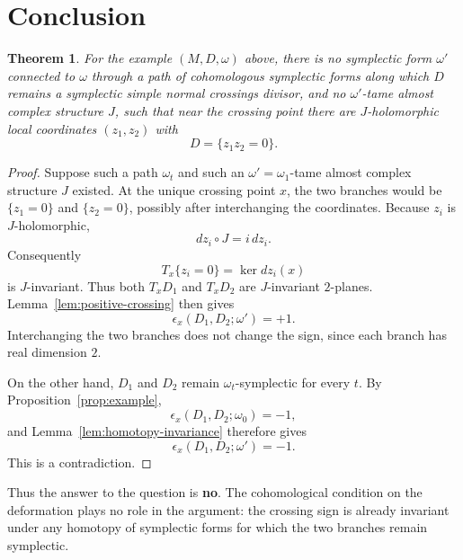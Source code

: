 \documentclass[11pt]{article}
\newtheorem{theorem}{Theorem}[section]
\theoremstyle{definition}
\theoremstyle{remark}
\begin{document}
\section{Conclusion}

\begin{theorem}\label{thm:negative-answer}
For the example $(M,D,\omega)$ above, there is no symplectic form $\omega'$
connected to $\omega$ through a path of cohomologous symplectic forms along
which $D$ remains a symplectic simple normal crossings divisor, and no
$\omega'$-tame almost complex structure $J$, such that near the crossing
point there are $J$-holomorphic local coordinates $(z_1,z_2)$ with
\[
D=\{z_1z_2=0\}.
\]
\end{theorem}

\begin{proof}
Suppose such a path $\omega_t$ and such an $\omega'=\omega_1$-tame almost
complex structure $J$ existed. At the unique crossing point $x$, the two
branches would be $\{z_1=0\}$ and $\{z_2=0\}$, possibly after interchanging
the coordinates. Because $z_i$ is $J$-holomorphic,
\[
dz_i\circ J=i\,dz_i.
\]
Consequently
\[
T_x\{z_i=0\}=\ker dz_i(x)
\]
is $J$-invariant. Thus both $T_xD_1$ and $T_xD_2$ are $J$-invariant
$2$-planes. Lemma~\ref{lem:positive-crossing} then gives
\[
\epsilon_x(D_1,D_2;\omega')=+1.
\]
Interchanging the two branches does not change the sign, since each branch
has real dimension $2$.

On the other hand, $D_1$ and $D_2$ remain $\omega_t$-symplectic for every
$t$. By Proposition~\ref{prop:example},
\[
\epsilon_x(D_1,D_2;\omega_0)=-1,
\]
and Lemma~\ref{lem:homotopy-invariance} therefore gives
\[
\epsilon_x(D_1,D_2;\omega')=-1.
\]
This is a contradiction.
\end{proof}

Thus the answer to the question is \textbf{no}. The cohomological condition
on the deformation plays no role in the argument: the crossing sign is
already invariant under any homotopy of symplectic forms for which the two
branches remain symplectic.
\end{document}

